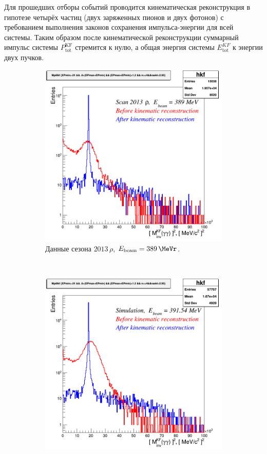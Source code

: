 Для прошедших отборы событий проводится кинематическая реконструкция в гипотезе четырёх частиц (двух заряженных пионов и двух фотонов) с требованием выполнения законов сохранения импульса-энергии для всей системы.
Таким образом после кинематической реконструкции суммарный импульс системы $P^{\text{KF}}_{\text{tot}}$ стремится к нулю,
а общая энергия системы $E^{KF}_{\text{tot}}$ к энергии двух пучков.
\begin{figure}[htbp]
    \centering
    \begin{subfigure}[t]{0.45\textwidth}
        \includegraphics[width=\textwidth]{img/diff_kf_mpi0_2013rho389.png}
        \caption{Данные сезона $2013 \, \rho$, $E_{\text{beam}} = \SI{389}{\MeVr}$.}\label{fig:3pi_diff_kf_mpi0_2013rho389}
    \end{subfigure}
    ~
    \begin{subfigure}[t]{0.45\textwidth}
        \includegraphics[width=\textwidth]{img/diff_kf_mpi0_sim391_54.png}

\end{subfigure}
\end{figure}
